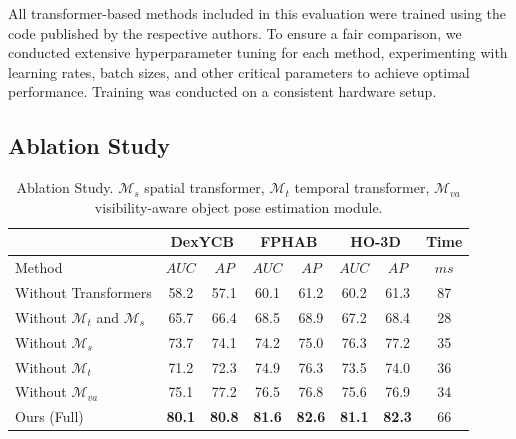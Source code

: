 All transformer-based methods included in this evaluation were trained using the code published by the respective authors. To ensure a fair comparison, we conducted extensive hyperparameter tuning for each method, experimenting with learning rates, batch sizes, and other critical parameters to achieve optimal performance. Training was conducted on a consistent hardware setup.

\subsection{Ablation Study}

\begin{table}[h]
\caption{Ablation Study. $\mathcal{M}_{s}$ spatial transformer, $\mathcal{M}_{t}$ temporal transformer, $\mathcal{M}_{va}$ visibility-aware object pose estimation module.}
\label{tab:ablation_ex}
\begin{center}
\begin{tabular}{l c c c c c c c} 
\hline
& \multicolumn{2}{c}{DexYCB} & \multicolumn{2}{c}{FPHAB} & \multicolumn{2}{c}{HO-3D} & Time \\
\hline
Method & $AUC$ & $AP$ & $AUC$ & $AP$ & $AUC$ & $AP$ & $ms$ \\  
\hline 

Without Transformers & 58.2 & 57.1 & 60.1 & 61.2 & 60.2 & 61.3 & 87 \\

Without $\mathcal{M}_{t}$ and $\mathcal{M}_{s}$ & 65.7 & 66.4 & 68.5 & 68.9 & 67.2 & 68.4 & 28 \\

Without $\mathcal{M}_{s}$ & 73.7 & 74.1 & 74.2 & 75.0 & 76.3 & 77.2 & 35 \\

Without $\mathcal{M}_{t}$ & 71.2 & 72.3 & 74.9 & 76.3 & 73.5 & 74.0 & 36 \\

Without $\mathcal{M}_{va}$ & 75.1 & 77.2 & 76.5 & 76.8 & 75.6 & 76.9 & 34 \\

Ours (Full) & \textbf{80.1} & \textbf{80.8} & \textbf{81.6} & \textbf{82.6} & \textbf{81.1} & \textbf{82.3} & 66 \\
\hline
\end{tabular}
\end{center}
\end{table}


